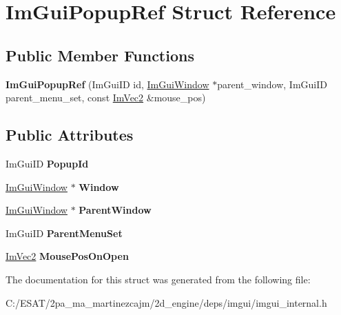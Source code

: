 \hypertarget{struct_im_gui_popup_ref}{}\section{Im\+Gui\+Popup\+Ref Struct Reference}
\label{struct_im_gui_popup_ref}
\subsection*{Public Member Functions}
\begin{DoxyCompactItemize}
\item 
\mbox{\label{struct_im_gui_popup_ref_af95848b705864b36b803745cd7b59250}} 
{\bfseries Im\+Gui\+Popup\+Ref} (Im\+Gui\+ID id, \hyperlink{struct_im_gui_window}{Im\+Gui\+Window} $\ast$parent\+\_\+window, Im\+Gui\+ID parent\+\_\+menu\+\_\+set, const \hyperlink{struct_im_vec2}{Im\+Vec2} \&mouse\+\_\+pos)
\end{DoxyCompactItemize}
\subsection*{Public Attributes}
\begin{DoxyCompactItemize}
\item 
\mbox{\label{struct_im_gui_popup_ref_a7037780575e28439414d28625a495bad}} 
Im\+Gui\+ID {\bfseries Popup\+Id}
\item 
\mbox{\label{struct_im_gui_popup_ref_a471027209038d1d59280a84c8d236f34}} 
\hyperlink{struct_im_gui_window}{Im\+Gui\+Window} $\ast$ {\bfseries Window}
\item 
\mbox{\label{struct_im_gui_popup_ref_a7925cc312e5632661e0e6a2195af21b2}} 
\hyperlink{struct_im_gui_window}{Im\+Gui\+Window} $\ast$ {\bfseries Parent\+Window}
\item 
\mbox{\label{struct_im_gui_popup_ref_afc2fc749bf54a0e3bab8defefe4a0a2b}} 
Im\+Gui\+ID {\bfseries Parent\+Menu\+Set}
\item 
\mbox{\label{struct_im_gui_popup_ref_ae7640a4130be4ba7518aee17c500d366}} 
\hyperlink{struct_im_vec2}{Im\+Vec2} {\bfseries Mouse\+Pos\+On\+Open}
\end{DoxyCompactItemize}


The documentation for this struct was generated from the following file\+:\begin{DoxyCompactItemize}
\item 
C\+:/\+E\+S\+A\+T/2pa\+\_\+ma\+\_\+martinezcajm/2d\+\_\+engine/deps/imgui/imgui\+\_\+internal.\+h\end{DoxyCompactItemize}
